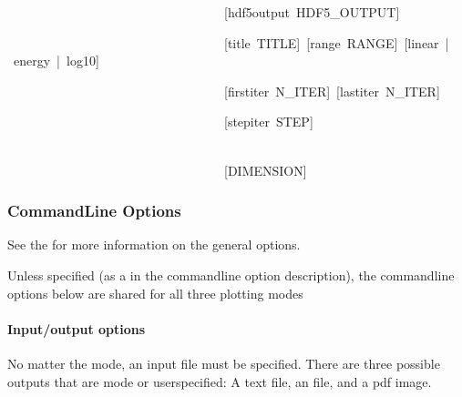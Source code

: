 \documentclass[letterpaper,10pt,english]{sphinxmanual}
\begin{document}
\begin{DUlineblock}{0em}
\item[] 
\item[] \textasciigrave{}\textasciigrave{}                                  {[}\textendash{}hdf5\sphinxhyphen{}output HDF5\_OUTPUT{]}\textasciigrave{}\textasciigrave{}
\item[] \textasciigrave{}\textasciigrave{}                                  {[}\textendash{}title TITLE{]} {[}\textendash{}range RANGE{]} {[}\textendash{}linear | \textendash{}energy | \textendash{}log10{]}\textasciigrave{}\textasciigrave{}
\item[] \textasciigrave{}\textasciigrave{}                                  {[}\textendash{}first\sphinxhyphen{}iter N\_ITER{]} {[}\textendash{}last\sphinxhyphen{}iter N\_ITER{]}\textasciigrave{}\textasciigrave{}
\item[] \textasciigrave{}\textasciigrave{}                                  {[}\textendash{}step\sphinxhyphen{}iter STEP{]}                                   \textasciigrave{}\textasciigrave{}
\item[] \textasciigrave{}\textasciigrave{}                                  {[}DIMENSION{]}\textasciigrave{}\textasciigrave{}
\end{DUlineblock}


\subsubsection{Command\sphinxhyphen{}Line Options}
\label{\detokenize{users_guide/command_line_tools/plothist:command-line-options}}
See the {\hyperref[\detokenize{users_guide/command_line_tools:command-line-tool-index}]{}} for more
information on the general options.

Unless specified (as a  in the command\sphinxhyphen{}line option description), the
command\sphinxhyphen{}line options below are shared for all three plotting modes


\paragraph{Input/output options}
\label{\detokenize{users_guide/command_line_tools/plothist:input-output-options}}
No matter the mode, an input  file must be specified. There are
three possible outputs that are mode or user\sphinxhyphen{}specified: A text file, an
 file, and a pdf image.
\end{document}
